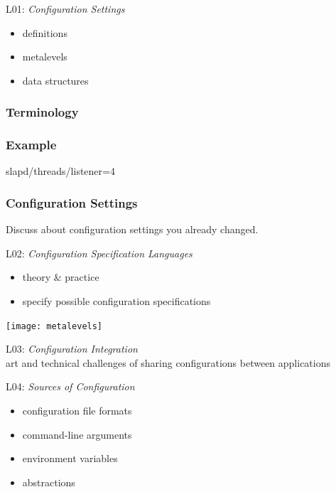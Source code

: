 \begin{frame}
	L01: \textit{Configuration Settings}
	\begin{itemize}
		\item definitions
		\item metalevels
		\item data structures
	\end{itemize}
\end{frame}

\begin{frame}
	\frametitle{Terminology}
	
\end{frame}

\begin{frame}[fragile]
	\frametitle{Example}

	\begin{code}[language=CfgElektra]
	slapd/threads/listener=4
	\end{code}
\end{frame}

\begin{assignment}
	\frametitle{Configuration Settings}
	\begin{task}
	Discuss about configuration settings you already changed.
	\end{task}
\end{assignment}

\begin{frame}
	L02: \textit{Configuration Specification Languages}
	\begin{itemize}
		\item theory \& practice
		\item specify possible configuration specifications
	\end{itemize}
	\vspace{0.5cm}
	\texttt{[image: metalevels]}
\end{frame}

\begin{frame}
	L03: \textit{Configuration Integration}
	\\ \vspace{1cm}
	art and technical challenges of sharing configurations between applications
\end{frame}


\begin{frame}
	L04: \textit{Sources of Configuration}
	\begin{itemize}
		\item configuration file formats
		\item command-line arguments
		\item environment variables
		\item abstractions
	\end{itemize}
\end{frame}

